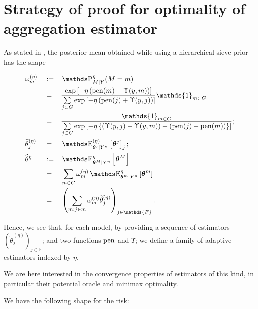 \section{Strategy of proof for optimality of aggregation estimator}\label{FREQ_STRATEGY}

As stated in , the posterior mean obtained while using a hierarchical sieve prior has the shape


\begin{alignat*}{3}
&\omega^{(\eta)}_{m} && := && \P_{M \vert Y}^{\eta}(M = m)\\
& && = && \frac{\exp\left[-\eta\left(\pen(m) + \Upsilon(y, m)\right)\right]}{\sum\limits_{j \subset G}\exp\left[- \eta \left(\pen(j) + \Upsilon(y, j)\right)\right]} \mathds{1}_{m \subset G}\\
& && = && \frac{\mathds{1}_{m \subset G}}{\sum\limits_{j \subset G}\exp\left[-\eta \left\{\left(\Upsilon(y, j) - \Upsilon(y, m)\right) + \left(\pen(j) - \pen(m)\right)\right\}\right]};\\
& \widetilde{\theta}_{j}^{(\eta)} && = && \E_{\boldsymbol{\theta}^{j} \vert Y^{n}}^{(\eta)}\left[\boldsymbol{\theta}^{j}\right]_{j};\\
& \widehat{\theta}^{\eta} && := && \E_{\boldsymbol{\theta}^{M}\vert Y^{n}}^{\eta}\left[\boldsymbol{\theta}^{M}\right]\\
& && = && \sum\limits_{m \in G} \omega^{(\eta)}_{m} \E_{\boldsymbol{\theta}^{m} \vert Y^{n}}^{\eta} \left[ \boldsymbol{\theta}^{m} \right]\\
& && = && \left(\sum\limits_{m: j \in m}\omega^{(\eta)}_{m} \widetilde{\theta}^{(\eta)}_{j}\right)_{j \in \mathds{F}}.
\end{alignat*}

Hence, we see that, for each model, by providing a sequence of estimators $\left(\widetilde{\theta}^{(\eta)}_{j}\right)_{j \in \mathds{F}}$; and two functions $\operatorname{pen}$ and $\Upsilon$; we define a family of adaptive estimators indexed by $\eta$.

\medskip

We are here interested in the convergence properties of estimators of this kind, in particular their potential oracle and minimax optimality.

We have the following shape for the risk:

